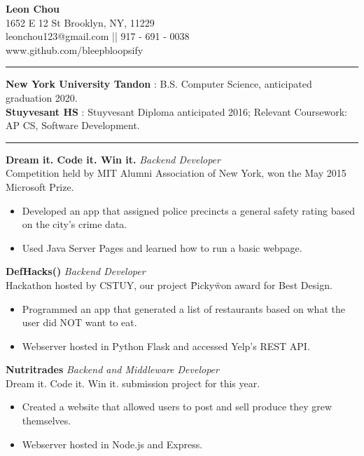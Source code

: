\documentclass[14]{article}
\begin{document}
  \begin{center}
    \textbf{{\LARGE Leon Chou}}\\
    1652 E 12 St Brooklyn, NY, 11229 \\
    leonchou123@gmail.com || 917 - 691 - 0038\\ www.github.com/bleepbloopsify\\
  \end{center}
  \vspace{0.1cm} \hrule \vspace{0.3cm}
  \noindent\textbf{New York University Tandon} : B.S. Computer Science, anticipated graduation 2020.\\
  \textbf{Stuyvesant HS} : Stuyvesant Diploma anticipated 2016;
  Relevant Coursework: AP CS, Software Development.\\

  \vspace{0.1cm} \hrule \vspace{0.3cm}
  \noindent\textbf{Dream it. Code it. Win it.}\textit{ Backend Developer}\\
  Competition held by MIT Alumni Association of New York, won the May 2015 Microsoft Prize.
  \begin{itemize}[label={--},noitemsep, topsep=0pt]
    \item Developed an app that assigned police precincts a general safety rating based on the city's crime data.
    \item Used Java Server Pages and learned how to run a basic webpage.
  \end{itemize}
  \textbf{DefHacks()}\textit{ Backend Developer}\\ Hackathon hosted by CSTUY, our project \"Picky\" won award for Best Design.
  \begin{itemize}[label={--},noitemsep, topsep=0pt]
    \item Programmed an app that generated a list of restaurants based on what the user did NOT want to eat.
    \item Webserver hosted in Python Flask and accessed Yelp's REST API.
  \end{itemize}
  \textbf{Nutritrades}\textit{ Backend and Middleware Developer}\\
  Dream it. Code it. Win it. submission project for this year.
  \begin{itemize}[label={--},noitemsep, topsep=0pt]
    \item Created a website that allowed users to post and sell produce they grew themselves.
    \item Webserver hosted in Node.js and Express.\\
  \end{itemize}
\end{document}
